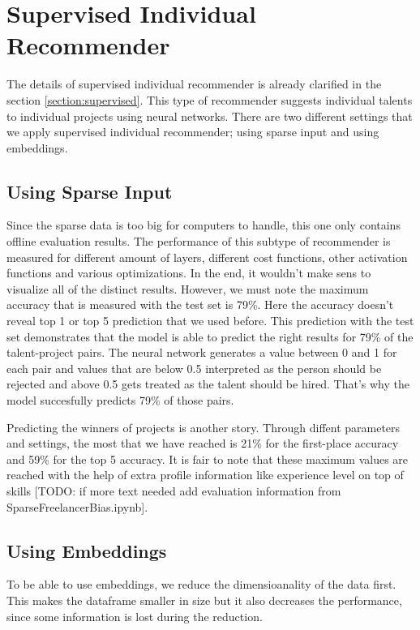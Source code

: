 \section{Supervised Individual Recommender}

The details of supervised individual recommender is already clarified in the section \ref{section:supervised}. This type of recommender suggests individual talents to individual projects using neural networks. There are two different settings that we apply supervised individual recommender; using sparse input and using embeddings. 

\subsection{Using Sparse Input}

Since the sparse data is too big for computers to handle, this one only contains offline evaluation results. The performance of this subtype of recommender is measured for different amount of layers, different cost functions, other activation functions and various optimizations. In the end, it wouldn't make sens to visualize all of the distinct results. However, we must note the maximum accuracy that is measured with the test set is 79\%. Here the accuracy doesn't reveal top 1 or top 5 prediction that we used before. This prediction with the test set demonstrates that the model is able to predict the right results for 79\% of the talent-project pairs. The neural network generates a value between 0 and 1 for each pair and values that are below 0.5 interpreted as the person should be rejected and above 0.5 gets treated as the talent should be hired. That's why the model succesfully predicts 79\% of those pairs.

Predicting the winners of projects is another story. Through diffent parameters and settings, the most that we have reached is 21\% for the first-place accuracy and 59\% for the top 5 accuracy. It is fair to note that these maximum values are reached with the help of extra profile information like experience level on top of skills [TODO: if more text needed add evaluation information from SparseFreelancerBias.ipynb]. 

\subsection{Using Embeddings}

To be able to use embeddings, we reduce the dimensioanality of the data first. This makes the dataframe smaller in size but it also decreases the performance, since some information is lost during the reduction. 

